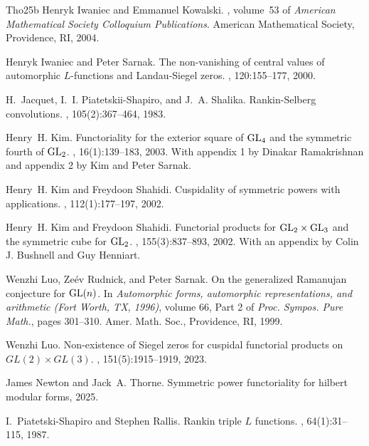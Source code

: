 \documentclass[12pt]{amsart}
\begin{document}
\begin{thebibliography}{Tho25b}
Henryk Iwaniec and Emmanuel Kowalski.
, volume~53 of {\em American Mathematical Society Colloquium Publications}.
\newblock American Mathematical Society, Providence, RI, 2004.

Henryk Iwaniec and Peter Sarnak.
\newblock The non-vanishing of central values of automorphic {$L$}-functions and {L}andau-{S}iegel zeros.
, 120:155--177, 2000.

H.~Jacquet, I.~I. Piatetskii-Shapiro, and J.~A. Shalika.
\newblock Rankin-{S}elberg convolutions.
, 105(2):367--464, 1983.

Henry~H. Kim.
\newblock Functoriality for the exterior square of {${\rm GL}_4$} and the symmetric fourth of {${\rm GL}_2$}.
, 16(1):139--183, 2003.
\newblock With appendix 1 by Dinakar Ramakrishnan and appendix 2 by Kim and Peter Sarnak.

Henry~H. Kim and Freydoon Shahidi.
\newblock Cuspidality of symmetric powers with applications.
, 112(1):177--197, 2002.

Henry~H. Kim and Freydoon Shahidi.
\newblock Functorial products for {${\rm GL}_2\times{\rm GL}_3$} and the symmetric cube for {${\rm GL}_2$}.
, 155(3):837--893, 2002.
\newblock With an appendix by Colin J. Bushnell and Guy Henniart.

Wenzhi Luo, Ze\'ev Rudnick, and Peter Sarnak.
\newblock On the generalized {R}amanujan conjecture for {${\rm GL}(n)$}.
\newblock In {\em Automorphic forms, automorphic representations, and arithmetic ({F}ort {W}orth, {TX}, 1996)}, volume 66, Part 2 of {\em Proc. Sympos. Pure Math.}, pages 301--310. Amer. Math. Soc., Providence, RI, 1999.

Wenzhi Luo.
\newblock Non-existence of {S}iegel zeros for cuspidal functorial products on {$GL(2) \times GL(3)$}.
, 151(5):1915--1919, 2023.

James Newton and Jack~A. Thorne.
\newblock Symmetric power functoriality for hilbert modular forms, 2025.

I.~Piatetski-Shapiro and Stephen Rallis.
\newblock Rankin triple {$L$} functions.
, 64(1):31--115, 1987.


\end{thebibliography}
\end{document}

